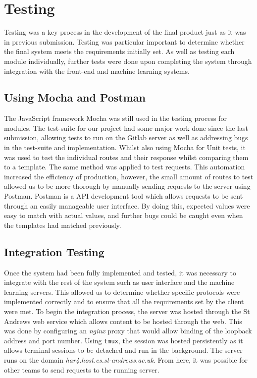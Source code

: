 \section{Testing}
Testing was a key process in the development of the final product just as it was in previous submission. Testing was particular important to determine whether the final system meets the requirements initially set. As well as testing each module individually, further tests were done upon completing the system through integration with the front-end and machine learning systems.

\subsection{Using Mocha and Postman}
The JavaScript framework Mocha was still used in the testing process for modules. The test-suite for our project had some major work done since the last submission, allowing tests to run on the Gitlab server as well as addressing bugs in the test-suite and implementation. Whilst also using Mocha for Unit tests, it was used to test the individual routes and their response whilst comparing them to a template. The same method was applied to test requests. This automation increased the efficiency of production, however, the small amount of routes to test allowed us to be more thorough by manually sending requests to the server using Postman. Postman is a API development tool which allows requests to be sent through an easily manageable user interface. By doing this, expected values were easy to match with actual values, and further bugs could be caught even when the templates had matched previously. 
\subsection{Integration Testing}
Once the system had been fully implemented and tested, it was necessary to integrate with the rest of the system such as user interface and the machine learning servers. This allowed us to determine whether specific protocols were implemented correctly and to ensure that all the requirements set by the client were met. To begin the integration process, the server was hosted through the St Andrews web service which allows content to be hosted through the web. This was done by configuring an \textit{nginx} proxy that would allow binding of the loopback address and port number. Using \texttt{tmux}, the session was hosted persistently as it allows terminal sessions to be detached and run in the background. The server runs on the domain \textit{har4.host.cs.st-andrews.ac.uk}. From here, it was possible for other teams to send requests to the running server. 
